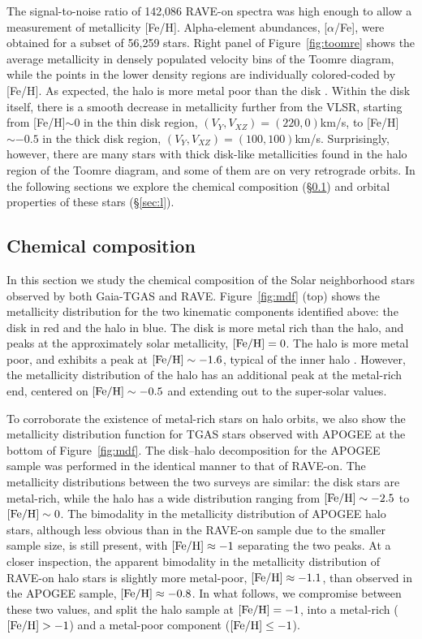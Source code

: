 \documentclass[apj, twocolappendix, numberedappendix, appendixfloats]{emulateapj}
\begin{document}
The signal-to-noise ratio of 142,086 RAVE-on spectra was high enough to allow a measurement of metallicity [Fe/H].
Alpha-element abundances, [$\alpha$/Fe], were obtained for a subset of 56,259 stars.
Right panel of Figure~\ref{fig:toomre} shows the average metallicity in densely populated velocity bins of the Toomre diagram, while the points in the lower density regions are individually colored-coded by [Fe/H].
As expected, the halo is more metal poor than the disk \citep[e.g.,][]{ivezic2008}.
Within the disk itself, there is a smooth decrease in metallicity further from the VLSR, starting from [Fe/H]$\sim0$ in the thin disk region, $(V_Y, V_{XZ})=(220,0)$\;km/s, to [Fe/H]$\sim-0.5$ in the thick disk region, $(V_Y, V_{XZ})=(100,100)$\;km/s.
Surprisingly, however, there are many stars with thick disk-like metallicities found in the halo region of the Toomre diagram, and some of them are on very retrograde orbits.
In the following sections we explore the chemical composition (\S\ref{sec:chem}) and orbital properties of these stars (\S\ref{sec:l}).

\subsection{Chemical composition}
\label{sec:chem}
In this section we study the chemical composition of the Solar neighborhood stars observed by both Gaia-TGAS and RAVE.
Figure~\ref{fig:mdf} (top) shows the metallicity distribution for the two kinematic components identified above: the disk in red and the halo in blue.
The disk is more metal rich than the halo, and peaks at the approximately solar metallicity, $\rm[Fe/H]=0$.
The halo is more metal poor, and exhibits a peak at $\rm[Fe/H]\sim-1.6$, typical of the inner halo \citep[e.g.,][]{allende-prieto2006}.
However, the metallicity distribution of the halo has an additional peak at the metal-rich end, centered on $\rm[Fe/H]\sim-0.5$ and extending out to the super-solar values.

To corroborate the existence of metal-rich stars on halo orbits, we also show the metallicity distribution function for TGAS stars observed with APOGEE at the bottom of Figure~\ref{fig:mdf}.
The disk--halo decomposition for the APOGEE sample was performed in the identical manner to that of RAVE-on.
The metallicity distributions between the two surveys are similar: the disk stars are metal-rich, while the halo has a wide distribution ranging from $\rm[Fe/H]\sim-2.5$ to $\rm[Fe/H]\sim0$.
The bimodality in the metallicity distribution of APOGEE halo stars, although less obvious than in the RAVE-on sample due to the smaller sample size, is still present, with $\rm[Fe/H]\approx-1$ separating the two peaks.
At a closer inspection, the apparent bimodality in the metallicity distribution of RAVE-on halo stars is slightly more metal-poor, $\rm[Fe/H]\approx-1.1$, than observed in the APOGEE sample, $\rm[Fe/H]\approx-0.8$.
In what follows, we compromise between these two values, and split the halo sample at $\rm[Fe/H]=-1$, into a metal-rich ($\rm[Fe/H]>-1$) and a metal-poor component ($\rm[Fe/H]\leq-1$).
\end{document}
